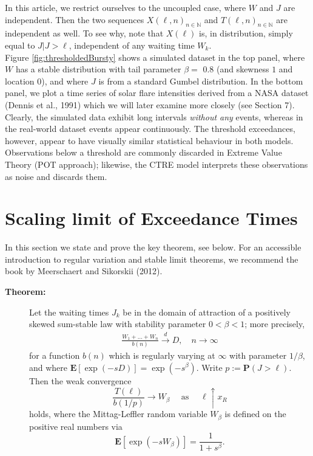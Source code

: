 \documentclass[]{elsarticle} %
\begin{document}
In this article, we restrict ourselves to the uncoupled case, where
\(W\) and \(J\) are independent. Then the two sequences
\(X(\ell, n)_{n \in \mathbb N}\) and \(T(\ell, n)_{n \in \mathbb N}\)
are independent as well. To see why, note that \(X(\ell)\) is, in
distribution, simply equal to \(J | J > \ell\), independent of any
waiting time \(W_k\).\\
Figure \ref{fig:thresholdedBursty} shows a simulated dataset in the top
panel, where \(W\) has a stable distribution with tail parameter
\(\beta =\) 0.8 (and skewness \(1\) and location \(0\)), and where \(J\)
is from a standard Gumbel distribution. In the bottom panel, we plot a
time series of solar flare intensities derived from a NASA dataset
(Dennis et al., 1991) which we will later examine more closely (see
Section 7). Clearly, the simulated data exhibit long intervals
\emph{without any} events, whereas in the real-world dataset events
appear continuously. The threshold exceedances, however, appear to have
visually similar statistical behaviour in both models. Observations
below a threshold are commonly discarded in Extreme Value Theory (POT
approach); likewise, the CTRE model interprets these observations as
noise and discards them.

\hypertarget{sec:scaling}{%
\section{Scaling limit of Exceedance Times}\label{sec:scaling}}

In this section we state and prove the key theorem, see below. For an
accessible introduction to regular variation and stable limit theorems,
we recommend the book by Meerschaert and Sikorskii (2012).

\begin{description}
\item[\textbf{Theorem:}]
Let the waiting times \(J_k\) be in the domain of attraction of a
positively skewed sum-stable law with stability parameter
\(0 < \beta < 1\); more precisely, \begin{align} \label{eq:stability}
\frac{W_1 + \ldots + W_n}{b(n)} \overset{d}{\longrightarrow} D, 
\quad n \to \infty
\end{align} for a function \(b(n)\) which is regularly varying at
\(\infty\) with parameter \(1/\beta\), and where
\(\mathbf E[\exp(-sD)] = \exp(-s^\beta)\). Write
\(p := \mathbf P(J > \ell)\). Then the weak convergence \[
\frac{T(\ell)} {b(1/p)} \to W_\beta \quad \text{ as } \quad \ell \uparrow x_R
\] holds, where the Mittag-Leffler random variable \(W_\beta\) is
defined on the positive real numbers via \[
\mathbf E[\exp(-sW_\beta)] = \frac{1}{1+s^\beta}.
\]
\end{description}
\end{document}
